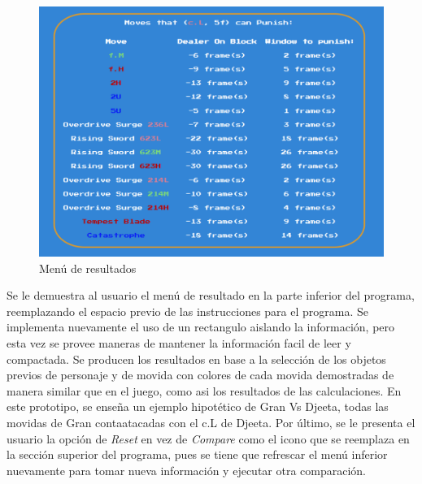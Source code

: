 \begin{center}
    \begin{figure}
        \centering
        \includegraphics[height=0.4\textheight]{figures/Results_menu-object.png}
        \caption{Menú de resultados}
        \label{fig: rslt prt}
    \end{figure}  
\end{center}

\newpage
    Se le demuestra al usuario el menú de resultado en la parte inferior del programa, reemplazando el espacio previo de las instrucciones para el programa. Se implementa nuevamente el uso de un rectangulo aislando la información, pero esta vez se provee maneras de mantener la información facil de leer y compactada. Se producen los resultados en base a la selección de los objetos previos de personaje y de movida con colores de cada movida demostradas de manera similar que en el juego, como asi los resultados de las calculaciones. En este  prototipo, se enseña un ejemplo hipotético de Gran Vs Djeeta, todas las movidas de Gran contaatacadas con el c.L de Djeeta. Por último, se le presenta el usuario la opción de \textit{Reset} en vez de \textit{Compare} como el icono que se reemplaza en la sección superior del programa, pues se tiene que refrescar el menú inferior nuevamente para tomar nueva información y ejecutar otra comparación.

